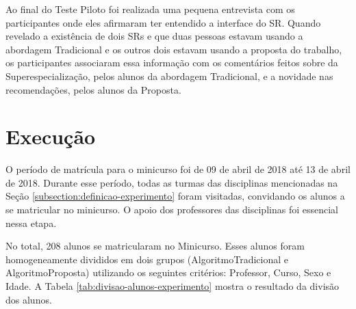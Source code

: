 Ao final do Teste Piloto foi realizada uma pequena entrevista com os participantes onde eles afirmaram ter entendido
a interface do SR. Quando revelado a existência de dois SRs e que duas pessoas estavam usando a abordagem
Tradicional e os outros dois estavam usando a proposta do trabalho, os participantes associaram essa informação com os
comentários feitos sobre da Superespecialização, pelos alunos da abordagem Tradicional, e a novidade nas recomendações,
pelos alunos da Proposta.

\section{Execução}\label{section:execucao-experimento}

O período de matrícula para o minicurso foi de 09 de abril de 2018 até 13 de abril de 2018. Durante esse período, todas
as turmas das disciplinas mencionadas na Seção \ref{subsection:definicao-experimento} foram visitadas, convidando os
alunos a se matricular no minicurso. O apoio dos professores das disciplinas foi essencial nessa etapa.

No total, 208 alunos se matricularam no Minicurso. Esses alunos foram homogeneamente divididos em dois grupos
(AlgoritmoTradicional e AlgoritmoProposta) utilizando os seguintes critérios: Professor, Curso, Sexo e Idade. A
Tabela \ref{tab:divisao-alunos-experimento} mostra o resultado da divisão dos alunos.

